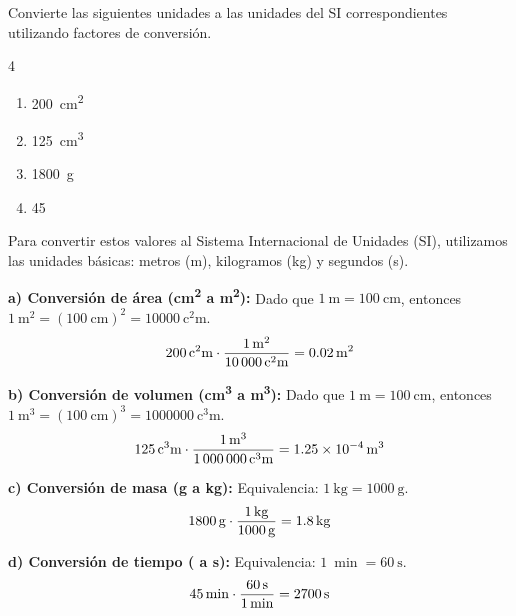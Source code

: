 \begin{exercise}
    Convierte las siguientes unidades a las unidades del SI correspondientes utilizando factores de conversión.
    \begin{multicols}{4}
        \begin{enumerate}[label=\letraminuscula]
            \item \qty{200}{\square\centi\metre}
            \item \qty{125}{\cubic\centi\metre}
            \item \qty{1800}{\g}
            \item \qty{45}{\min}
        \end{enumerate}
    \end{multicols}


    \begin{solu}
        Para convertir estos valores al Sistema Internacional de Unidades (SI), utilizamos las unidades básicas: metros (\unit{\m}), kilogramos (\unit{\kg}) y segundos (\unit{\s}).

        \textbf{a) Conversión de área (\unit{\square\centi\metre} a \unit{\square\metre}):}
        Dado que \( \qty{1}{\metre} = \qty{100}{\centi\metre} \), entonces \( \qty{1}{\square\metre} = (\qty{100}{\centi\metre})^2 = \qty{10000}{\square\centi\metre} \).
        \[ \qty{200}{\cancel{\square\centi\metre}} \cdot \frac{\qty{1}{\square\metre}}{\qty{10000}{\cancel{\square\centi\metre}}} = \qty{0.02}{\square\metre} \]

        \textbf{b) Conversión de volumen (\unit{\cubic\centi\metre} a \unit{\cubic\metre}):}
        Dado que \( \qty{1}{\metre} = \qty{100}{\centi\metre} \), entonces \( \qty{1}{\cubic\metre} = (\qty{100}{\centi\metre})^3 = \qty{1000000}{\cubic\centi\metre} \).
        \[ \qty{125}{\cancel{\cubic\centi\metre}} \cdot \frac{\qty{1}{\cubic\metre}}{\qty{1000000}{\cancel{\cubic\centi\metre}}} = \qty{1.25e-4}{\cubic\metre} \]

        \textbf{c) Conversión de masa (\unit{\g} a \unit{\kg}):}
        Equivalencia: \( \qty{1}{\kg} = \qty{1000}{\g} \).
        \[ \qty{1800}{\cancel{\g}} \cdot \frac{\qty{1}{\kg}}{\qty{1000}{\cancel{\g}}} = \qty{1.8}{\kg} \]

        \textbf{d) Conversión de tiempo (\unit{\min} a \unit{\s}):}
        Equivalencia: \( \qty{1}{\min} = \qty{60}{\s} \).
        \[ \qty{45}{\cancel{\min}} \cdot \frac{\qty{60}{\s}}{\qty{1}{\cancel{\min}}} = \qty{2700}{\s} \]
    \end{solu}

\end{exercise}


